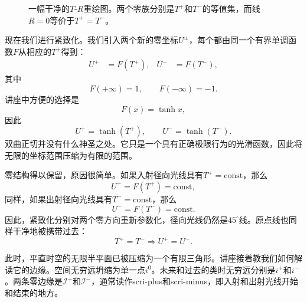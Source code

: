 \begin{figure}[htbp]
\centering
{}
\caption{一幅干净的\(T\)-\(R\)重绘图。两个零族分别是\(T^+\)和\(T^-\)的等值集，而线\(R=0\)等价于\(T^+=T^-\)。}
\end{figure}

现在我们进行紧致化。我们引入两个新的零坐标\(U^\pm\)，每个都由同一个有界单调函数\(F\)从相应的\(T^\pm\)得到：
\begin{align}
U^+ &= F(T^+), &
U^- &= F(T^-),
\end{align}
其中
\begin{equation}
F(+\infty)=1,
\qquad
F(-\infty)=-1.
\end{equation}
讲座中方便的选择是
\begin{equation}
F(x)=\tanh x,
\end{equation}
因此
\begin{equation}
U^+ = \tanh(T^+),
\qquad
U^- = \tanh(T^-).
\end{equation}
双曲正切并没有什么神圣之处。它只是一个具有正确极限行为的光滑函数，因此将无限的坐标范围压缩为有限的范围。

零结构得以保留，原因很简单。如果入射径向光线具有\(T^+=\text{const}\)，那么
\[
U^+=F(T^+)=\text{const},
\]
同样，如果出射径向光线具有\(T^-=\text{const}\)，那么
\[
U^-=F(T^-)=\text{const}.
\]
因此，紧致化分别对两个零方向重新参数化，径向光线仍然是\(45^\circ\)线。原点线也同样干净地被携带过去：
\[
T^+=T^- \Longrightarrow U^+=U^-.
\]

此时，平直时空的无限半平面已被压缩为一个有限三角形。讲座接着教我们如何解读它的边缘。空间无穷远坍缩为单一点\(i^0\)。未来和过去的类时无穷远分别是\(i^+\)和\(i^-\)。两条零边缘是\(\mathcal{I}^+\)和\(\mathcal{I}^-\)，通常读作scri-plus和scri-minus，即入射和出射光线开始和结束的地方。

